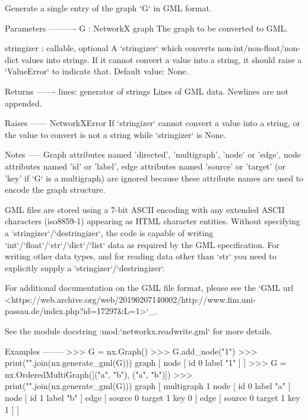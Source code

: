 \begin{DoxyVerb}Generate a single entry of the graph `G` in GML format.

Parameters
----------
G : NetworkX graph
    The graph to be converted to GML.

stringizer : callable, optional
    A `stringizer` which converts non-int/non-float/non-dict values into
    strings. If it cannot convert a value into a string, it should raise a
    `ValueError` to indicate that. Default value: None.

Returns
-------
lines: generator of strings
    Lines of GML data. Newlines are not appended.

Raises
------
NetworkXError
    If `stringizer` cannot convert a value into a string, or the value to
    convert is not a string while `stringizer` is None.

Notes
-----
Graph attributes named 'directed', 'multigraph', 'node' or
'edge', node attributes named 'id' or 'label', edge attributes
named 'source' or 'target' (or 'key' if `G` is a multigraph)
are ignored because these attribute names are used to encode the graph
structure.

GML files are stored using a 7-bit ASCII encoding with any extended
ASCII characters (iso8859-1) appearing as HTML character entities.
Without specifying a `stringizer`/`destringizer`, the code is capable of
writing `int`/`float`/`str`/`dict`/`list` data as required by the GML
specification.  For writing other data types, and for reading data other
than `str` you need to explicitly supply a `stringizer`/`destringizer`.

For additional documentation on the GML file format, please see the
`GML url <https://web.archive.org/web/20190207140002/http://www.fim.uni-passau.de/index.php?id=17297&L=1>`_.

See the module docstring :mod:`networkx.readwrite.gml` for more details.

Examples
--------
>>> G = nx.Graph()
>>> G.add_node("1")
>>> print("\n".join(nx.generate_gml(G)))
graph [
  node [
    id 0
    label "1"
  ]
]
>>> G = nx.OrderedMultiGraph([("a", "b"), ("a", "b")])
>>> print("\n".join(nx.generate_gml(G)))
graph [
  multigraph 1
  node [
    id 0
    label "a"
  ]
  node [
    id 1
    label "b"
  ]
  edge [
    source 0
    target 1
    key 0
  ]
  edge [
    source 0
    target 1
    key 1
  ]
]
\end{DoxyVerb}
 \mbox{\label{namespacenetworkx_1_1readwrite_1_1gml_a333bb415789b52c5a1309d059827841f}} 
